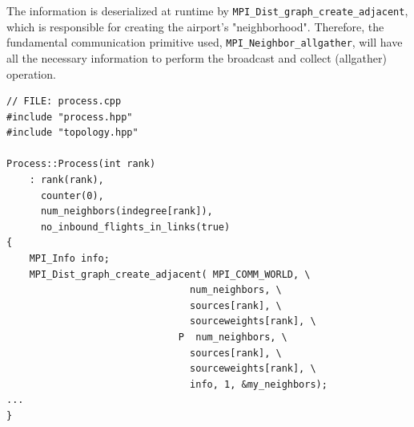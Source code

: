 \documentclass[11pt]{article}
\begin{document}
The information is deserialized at runtime by \texttt{MPI\_Dist\_graph\_create\_adjacent}, 
which is responsible for creating the airport's "neighborhood".
Therefore, the fundamental communication primitive used, \texttt{MPI\_Neighbor\_allgather}, 
will have all the necessary information to perform the broadcast and collect (allgather) operation.
\begin{verbatim}
// FILE: process.cpp
#include "process.hpp"
#include "topology.hpp"

Process::Process(int rank)
    : rank(rank),
      counter(0),
      num_neighbors(indegree[rank]),
      no_inbound_flights_in_links(true)
{
    MPI_Info info;
    MPI_Dist_graph_create_adjacent( MPI_COMM_WORLD, \
                                num_neighbors, \
                                sources[rank], \
                                sourceweights[rank], \
                              P  num_neighbors, \
                                sources[rank], \
                                sourceweights[rank], \
                                info, 1, &my_neighbors);
...
}
\end{verbatim}
\end{document}
